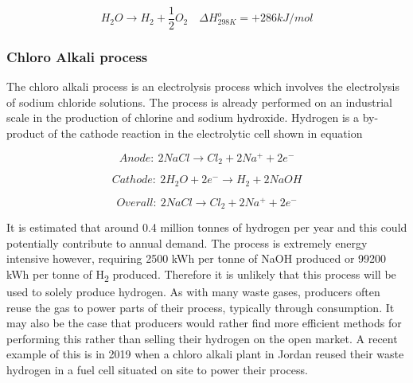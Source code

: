 \begin{equation}\label{thermdec}
    H_2 O \rightarrow H_2 + \frac{1}{2} O_2  \quad \Delta H_{298K}^o = +286 kJ/mol
\end{equation}

\subsubsection*{Chloro Alkali process}
The chloro alkali process is an electrolysis process which involves the electrolysis of sodium chloride solutions. The process is already performed on an industrial scale in the production of chlorine and sodium hydroxide. Hydrogen is a by-product of the cathode reaction in the electrolytic cell shown in equation \label{cathode}

\begin{equation}\label{anode}
    Anode:\: 2NaCl \rightarrow Cl_2 + 2Na^+ + 2e^-
\end{equation}


\begin{equation}\label{cathode}
    Cathode:\: 2H_2O + 2e^- \rightarrow H_2 + 2NaOH
\end{equation}

\begin{equation}\label{overall}
    Overall:\: 2NaCl \rightarrow Cl_2 + 2Na^+ + 2e^-
\end{equation}

It is estimated that around 0.4 million tonnes of hydrogen per year and this could potentially contribute to annual demand. \cite{argonnenationallab_2017} The process is extremely energy intensive however, requiring 2500 kWh per tonne of NaOH produced or 99200 kWh per tonne of H\textsubscript{2} produced. \cite{doi:10.1021/ed057pA270.1} Therefore it is unlikely that this process will be used to solely produce hydrogen. As with many waste gases, producers often reuse the gas to power parts of their process, typically through consumption. It may also be the case that producers would rather find more efficient methods for performing this rather than selling their hydrogen on the open market. A recent example of this is in 2019 when a chloro alkali plant in Jordan reused their waste hydrogen in a fuel cell situated on site to power their process. \cite{doi:10.1177/0144598719839767}

